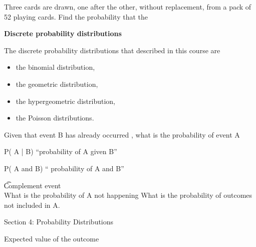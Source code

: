 \documentclass[]{report}
\begin{document}
{{{ Three cards are drawn, one after the other, without replacement, from a pack of 52 playing cards.
Find the probability that the









\noindent \textbf{Discrete probability distributions}

The discrete probability distributions that described in this course are
\begin{itemize}
\item the binomial distribution, 
\item the geometric distribution,
\item the hypergeometric distribution, 
\item the Poisson distributions.
\end{itemize}


%










Given that event B has already occurred ,   what is the probability of event A

P( A | B)  “probability of A given B”

P( A and B) “ probability of A and B”

\t{Complement event}\\

What is the probability of A not happening
What is the probability of outcomes not included in A.




Section 4: Probability Distributions

Expected value of the outcome

}}}
\end{document}
